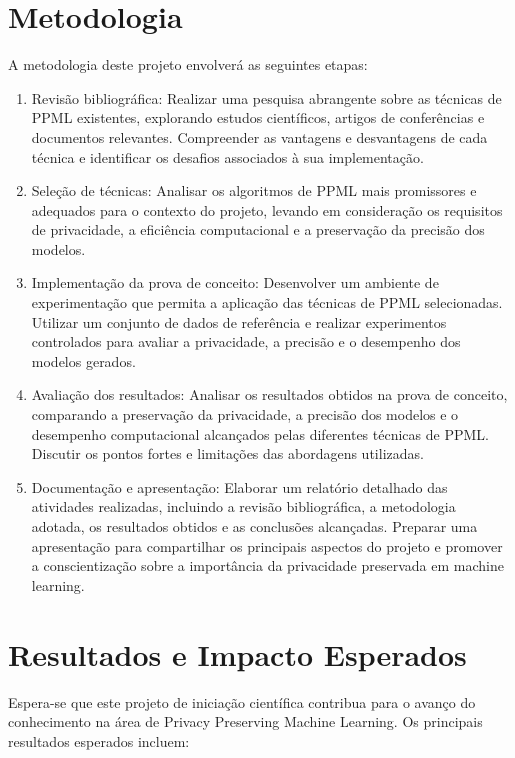 \documentclass{article}
\begin{document}
\section{Metodologia}
A metodologia deste projeto envolverá as seguintes etapas:

\begin{enumerate}
\item Revisão bibliográfica: Realizar uma pesquisa abrangente sobre as técnicas de PPML existentes, explorando estudos científicos, artigos de conferências e documentos relevantes. Compreender as vantagens e desvantagens de cada técnica e identificar os desafios associados à sua implementação.
\item Seleção de técnicas: Analisar os algoritmos de PPML mais promissores e adequados para o contexto do projeto, levando em consideração os requisitos de privacidade, a eficiência computacional e a preservação da precisão dos modelos.
\item Implementação da prova de conceito: Desenvolver um ambiente de experimentação que permita a aplicação das técnicas de PPML selecionadas. Utilizar um conjunto de dados de referência e realizar experimentos controlados para avaliar a privacidade, a precisão e o desempenho dos modelos gerados.
\item Avaliação dos resultados: Analisar os resultados obtidos na prova de conceito, comparando a preservação da privacidade, a precisão dos modelos e o desempenho computacional alcançados pelas diferentes técnicas de PPML. Discutir os pontos fortes e limitações das abordagens utilizadas.

\item Documentação e apresentação: Elaborar um relatório detalhado das atividades realizadas, incluindo a revisão bibliográfica, a metodologia adotada, os resultados obtidos e as conclusões alcançadas. Preparar uma apresentação para compartilhar os principais aspectos do projeto e promover a conscientização sobre a importância da privacidade preservada em machine learning.
\end{enumerate}

\section{Resultados e Impacto Esperados}
Espera-se que este projeto de iniciação científica contribua para o avanço do conhecimento na área de Privacy Preserving Machine Learning. Os principais resultados esperados incluem:
\end{document}
